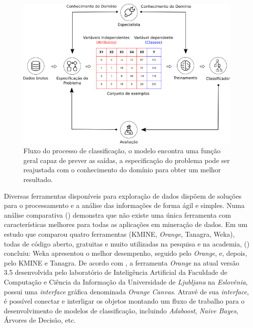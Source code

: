 \begin{figure}[H]
\begin{center}
    \includegraphics[scale=0.60]{images/processo_classificacao.png}
\end{center}
\caption{Fluxo do processo de classificação, o modelo encontra uma função geral 
capaz de prever as saídas, a especificação do problema pode ser reajustada com 
o conhecimento do domínio para obter um melhor resultado.}
\label{figure:processo_classificacao}
\end{figure}

Diversas ferramentas disponíveis para exploração de dados dispõem de soluções 
para o processamento e a análise das informações de forma ágil e simples. 
Numa análise comparativa  
(\citeyear{boscarioli2014avaliaccao}) demonstra que não existe uma única 
ferramenta com características melhores para todas as aplicações em mineração 
de dados. Em um estudo que comparou quatro ferramentas (KMINE, \textit{Orange}, 
Tanagra, Weka), todas de código aberto, gratuitas e muito utilizadas na 
pesquisa e na academia,  
(\citeyear{wahbeh2011comparison}) concluiu: Weka apresentou o melhor 
desempenho, seguido pelo \textit{Orange}, e, depois, pelo KMINE e Tanagra. 
De acordo com \cite{JMLR:demsar13a}, a ferramenta \textit{Orange} na 
atual versão 3.5 desenvolvida pelo laboratório de Inteligência Artificial da 
Faculdade de Computação e Ciência da Informação da Universidade de 
\textit{Ljubljana} na \textit{Eslovênia}, possui uma \textit{interface} gráfica 
denominada \textit{Orange Canvas}. Atravé de sua \textit{interface}, é possível 
conectar e interligar os objetos montando um fluxo de trabalho para o 
desenvolvimento de modelos de classificação, incluindo \textit{Adaboost}, 
\textit{Naive Bayes}, Árvores de Decisão, etc.

